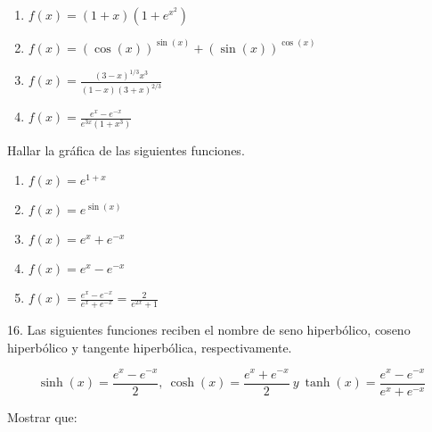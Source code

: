 \documentclass[12pt]{article}
\begin{document}
\begin{enumerate}[\hspace{9px} a)]
    \item \(f(x)=(1+x)(1+e^{x^2})\)

    \item \(f(x)=(\cos(x))^{\sin(x)}+(\sin(x))^{\cos(x)}\)

    \item \(f(x)=\displaystyle\frac{(3-x)^{1/3}x^3}{(1-x)(3+x)^{2/3}}\)

    \item \(f(x)=\displaystyle\frac{e^x-e^{-x}}{e^{3x}(1+x^3)}\)

\end{enumerate}

Hallar la gr\'afica de las siguientes funciones.

\begin{enumerate}[\hspace{9px} a)]
    \item \(f(x)=e^{1+x}\)

    \item \(f(x)=e^{\sin(x)}\)

    \item \(f(x)=e^x+e^{-x}\)

    \item \(f(x)=e^x-e^{-x}\)

    \item \(f(x)=\displaystyle\frac{e^x-e^{-x}}{e^x+e^{-x}}=\frac{2}{e^{2x}+1}\)

\end{enumerate}

16. Las siguientes funciones reciben el nombre de seno hiperb\'olico, coseno hiperb\'olico y tangente hiperb\'olica, respectivamente.

\begin{equation*}
    \sinh(x)=\frac{e^x-e^{-x}}{2}, \ \cosh(x)=\frac{e^x+e^{-x}}{2} \ y \ \tanh(x)=\frac{e^x-e^{-x}}{e^x+e^{-x}}
\end{equation*}

Mostrar que:
\end{document}
